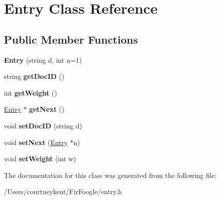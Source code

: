 \hypertarget{class_entry}{\section{Entry Class Reference}
\label{class_entry}
}
\subsection*{Public Member Functions}
\begin{DoxyCompactItemize}
\item 
\hypertarget{class_entry_a5d09dc65e8af6bf2ed9dafe27b43c042}{{\bfseries Entry} (string d, int n=1)}\label{class_entry_a5d09dc65e8af6bf2ed9dafe27b43c042}

\item 
\hypertarget{class_entry_abe9174e29e54bd66341445c70d08460d}{string {\bfseries get\+Doc\+I\+D} ()}\label{class_entry_abe9174e29e54bd66341445c70d08460d}

\item 
\hypertarget{class_entry_a6ad92a2390f0947f95b2f9afb371cc70}{int {\bfseries get\+Weight} ()}\label{class_entry_a6ad92a2390f0947f95b2f9afb371cc70}

\item 
\hypertarget{class_entry_a3bf31a120e5b577c5f83bcd2b8c1e27a}{\hyperlink{class_entry}{Entry} $\ast$ {\bfseries get\+Next} ()}\label{class_entry_a3bf31a120e5b577c5f83bcd2b8c1e27a}

\item 
\hypertarget{class_entry_aa5c91dabaeb85d4ce1719440c0f247fb}{void {\bfseries set\+Doc\+I\+D} (string d)}\label{class_entry_aa5c91dabaeb85d4ce1719440c0f247fb}

\item 
\hypertarget{class_entry_ae768819c19aaad2dfaee131b459ae698}{void {\bfseries set\+Next} (\hyperlink{class_entry}{Entry} $\ast$n)}\label{class_entry_ae768819c19aaad2dfaee131b459ae698}

\item 
\hypertarget{class_entry_a644a45c77332b45a242f5b7833b12088}{void {\bfseries set\+Weight} (int w)}\label{class_entry_a644a45c77332b45a242f5b7833b12088}

\end{DoxyCompactItemize}


The documentation for this class was generated from the following file\+:\begin{DoxyCompactItemize}
\item 
/\+Users/courtneykent/\+Fir\+Foogle/entry.\+h\end{DoxyCompactItemize}
